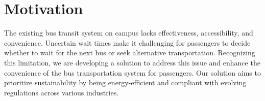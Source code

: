 
\section{Motivation}

The existing bus transit system on campus lacks effectiveness, accessibility, and convenience. Uncertain wait times make it challenging for passengers to decide whether to wait for the next bus or seek alternative transportation. Recognizing this limitation, we are developing a solution to address this issue and enhance the convenience of the bus transportation system for passengers. Our solution aims to prioritize sustainability by being energy-efficient and compliant with evolving regulations across various industries.
